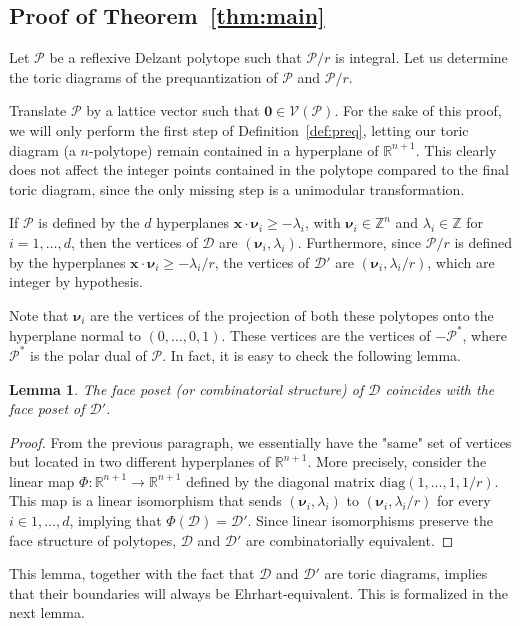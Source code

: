 \documentclass[a4paper,11pt,reqno]{amsart}
\newcommand{\Pp}{{\mathcal P}}
\newtheorem{lemma}[theorem]{Lemma}
\begin{document}
\subsection{Proof of Theorem~\ref{thm:main}}

Let $\mathcal{P}$ be a reflexive Delzant polytope such that $\mathcal{P}/r$ is integral. 
Let us determine the toric diagrams of the prequantization of  $\mathcal{P}$ and $\mathcal{P}/r$.

Translate $\mathcal{P}$ by a lattice vector such that $\bm{0} \in \mathcal{V}(\mathcal{P})$. 
For the sake of this proof, we will only perform the first step of Definition~\ref{def:preq}, letting 
our toric diagram (a $n$-polytope) remain contained in a hyperplane of $\mathbb{R}^{n+1}$. 
This clearly does not affect the integer points contained in the polytope compared to the final 
toric diagram, since the only missing step is a unimodular transformation.

If $\mathcal{P}$ is defined by the $d$ hyperplanes $\bm{x} \cdot \bm{\nu}_i \geq -\lambda_i$, with 
$\bm{\nu}_i \in \mathbb{Z}^n$ and $\lambda_i \in \mathbb{Z}$ for $i = 1, \dots, d$, then the 
vertices of $\mathcal{D}$ are $(\bm{\nu}_i, \lambda_i)$. Furthermore, since $\mathcal{P}/r$ is 
defined by the hyperplanes $\bm{x} \cdot \bm{\nu}_i \geq -\lambda_i/r$, the vertices of $\mathcal{D}'$ 
are $(\bm{\nu}_i, \lambda_i/r)$, which are integer by hypothesis.

Note that $\bm{\nu}_i$ are the vertices of the projection of both these polytopes onto the hyperplane 
normal to $(0,\dots,0,1)$. These vertices are the vertices of $-\mathcal{P}^\ast$, where $\Pp^\ast$ is
the polar dual of $\mathcal{P}$. In fact, it is easy to check the following lemma.
\begin{lemma}\label{lemma:0}
The face poset (or combinatorial structure) of $\mathcal{D}$ coincides with the face poset of 
$\mathcal{D}'$.
\end{lemma}
\begin{proof}
From the previous paragraph, we essentially have the "same" set of vertices but located in two 
different hyperplanes of $\mathbb{R}^{n+1}$. More precisely, consider the linear map 
$\Phi: \mathbb{R}^{n+1} \to \mathbb{R}^{n+1}$ defined by the diagonal matrix 
$\text{diag}(1, \dots, 1, 1/r)$. This map is a linear isomorphism that sends $(\bm{\nu}_i, \lambda_i)$ to 
$(\bm{\nu}_i, \lambda_i/r)$ for every $i \in 1, \dots, d$, implying that $\Phi(\mathcal{D}) = \mathcal{D}'$. 
Since linear isomorphisms preserve the face structure of polytopes, $\mathcal{D}$ and $\mathcal{D}'$ 
are combinatorially equivalent.
\end{proof}
\noindent This lemma, together with the fact that $\mathcal{D}$ and $\mathcal{D}'$ are toric diagrams, 
implies that their boundaries will always be Ehrhart-equivalent. This is formalized in the next lemma.
\end{document}
